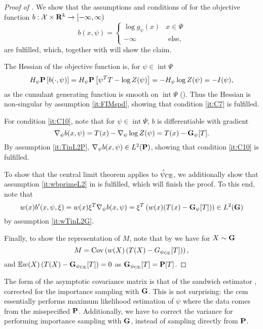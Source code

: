 \begin{proof}[Proof of ]
    We show that the assumptions and conditions of  for the objective function $b : \mathcal X \times \R^{k} \to [-\infty, \infty)$ 
    $$
        b(x,\psi) = \begin{cases}
            \log g_{\psi}(x) & x\in\Psi\\
            - \infty & \text{ else,}
        \end{cases}
    $$
    are fulfilled, which, together with  will show the claim. 

    The Hessian of the objective function is, for $\psi \in \operatorname{int} \Psi$
    $$
        H_{\psi} \P \left[ b(\cdot, \psi) \right] = H_{\psi} \P \left[ \psi^{T} T - \log Z(\psi) \right] = -H_{\psi}\log Z(\psi)  = - I(\psi),
    $$
    as the cumulant generating function is smooth on $ \operatorname{int} \Psi$ (). Thus the Hessian is non-singular by assumption \ref{it:FIMspd}, showing that condition \ref{it:C7} is fulfilled.

    For condition \ref{it:C10}, note that for $\psi \in \operatorname{int} \Psi$, $b$ is differentiable with gradient 
    $$
        \nabla_{\psi} b(x, \psi) = T(x) - \nabla_{\psi} \log Z(\psi) = T(x) - \G_{\psi} [T].
    $$
    By assumption \ref{it:TinL2P}, $\nabla_{\psi} b(x,\psi) \in L^{2} (\P)$, showing that condition \ref{it:C10} is fulfilled.

    To show that the central limit theorem applies to $\hpce$, we additionally show that assumption \ref{it:wbprimeL2} in  is fulfilled, which will finish the proof. To this end, note that 
    $$
        w(x)b'(x,\psi,\xi) = w(x) \xi^{T}\nabla_{\psi} b(x, \psi) = \xi^{T} \left( w(x) (T(x) - \G_{\psi}[T]) \right) \in L^{2} (\G)
    $$
    by assumption \ref{it:wTinL2G}.

    Finally, to show the representation of $M$, note that by  we have for $X \sim \G$
    $$
        M = \cov \left( w(X) \left( T(X) - G_{\pce}[T]\right)\right),
    $$
    and $\E w(X) \left( T(X) - \G_{\pce} [T] \right) = 0$ as $\G_{\pce} [T] = \P [T]$.
\end{proof}

The form of the asymptotic covariance matrix is that of the sandwich estimator \citep{White1982Maximum}, corrected for the importance sampling with $\G$. This is not surprising: the \acrshort{cem} essentially performs maximum likelihood estimation of $\psi$ where the data comes from the misspecified $\P$. Additionally, we have to correct the variance for performing importance sampling with $\G$, instead of sampling directly from $\P$.

